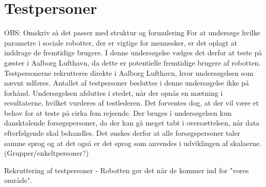 \section{Testpersoner}
\label{ParametreTestpersoner}
%
OBS: Omskriv så det passer med struktur og formulering\blankline
%
For at undersøge hvilke parametre i sociale robotter, der er vigtige for mennesker, er det oplagt at inddrage de fremtidige brugere. I denne undersøgelse vælges det derfor at teste på gæster i Aalborg Lufthavn, da dette er potentielle fremtidige brugere af robotten. Testpersonerne rekrutteres direkte i Aalborg Lufthavn, hvor undersøgelsen som nævnt udføres. Antallet af testpersoner besluttes i denne undersøgelse ikke på forhånd. Undersøgelsen afsluttes i stedet, når der opnås en mætning i resultaterne, hvilket vurderes af testlederen. Det forventes dog, at der vil være et behov for at teste på cirka fem rejsende. Der bruges i undersøgelsen kun dansktalende forsøgspersoner, da der kan gå meget tabt i oversættelsen, når data efterfølgende skal behandles. Det ønskes derfor at alle forsøgspersoner taler samme sprog og at det også er det sprog som anvendes i udviklingen af skalaerne. (Grupper/enkeltpersoner?)




Rekruttering af testpersoner - Robotten gør det når de kommer ind for "vores område".